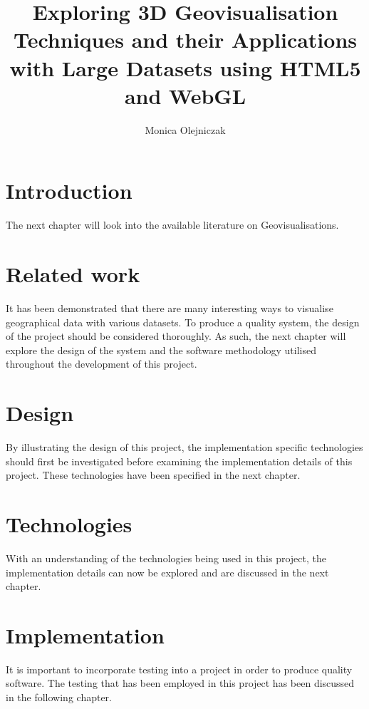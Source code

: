 \documentclass[
	paper=A4,
	titlepage=true,
	appendixprefix=true,
	headings=appendixwithoutprefixline,
	fontsize=11pt,
	parskip=half
]{scrreprt}
\title{Exploring 3D Geovisualisation Techniques and their Applications with Large Datasets using HTML5 and WebGL}
\author{Monica Olejniczak}
\begin{document}
	
	
	\chapter{Introduction} {
	\label{ch:introduction}
		
	}

	The next chapter will look into the available literature on Geovisualisations.

	\chapter{Related work} {
	\label{ch:related_work}
		
	}

	It has been demonstrated that there are many interesting ways to visualise geographical data with various datasets. To produce a quality system, the design of the project should be considered thoroughly. As such, the next chapter will explore the design of the system and the software methodology utilised throughout the development of this project.
	
	\chapter{Design} {
	\label{ch:design}
		
	}

	By illustrating the design of this project, the implementation specific technologies should first be investigated before examining the implementation details of this project. These technologies have been specified in the next chapter.

	\chapter{Technologies} {
	\label{ch:technologies}
		
	}

	With an understanding of the technologies being used in this project, the implementation details can now be explored and are discussed in the next chapter.
	
	\chapter{Implementation} {
	\label{ch:implementation}
		
	}

	It is important to incorporate testing into a project in order to produce quality software. The testing that has been employed in this project has been discussed in the following chapter.
\end{document}

